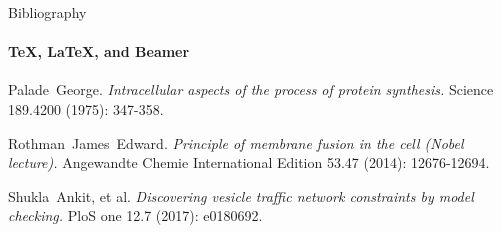 \documentclass{beamer}
\begin{document}




    \begin{frame}[label=bibliography]{Bibliography}
      \framesubtitle{\TeX, \LaTeX, and Beamer}
      \begin{thebibliography}{9}
      Palade~George. 
      \emph{Intracellular aspects of the process of protein synthesis.}
      Science 189.4200 (1975): 347-358.
      
      Rothman~James~Edward. 
      \emph{Principle of membrane fusion in the cell (Nobel lecture).}
      Angewandte Chemie International Edition 53.47 (2014): 12676-12694.
      
      Shukla~Ankit, et al. 
      \emph{Discovering vesicle traffic network constraints by model checking.}
      PloS one 12.7 (2017): e0180692.
      
      \end{thebibliography}
    \end{frame}
\end{document}
